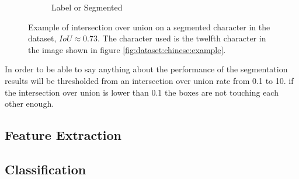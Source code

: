 \begin{figure}[ht]
\begin{subfigure}{0.24\textwidth}
    \caption{Label or Segmented}
    \label{fig:experiment:or}
  \end{subfigure}
  \caption{Example of intersection over union on a segmented character in the dataset, $IoU \approx 0.73$. The character used is the twelfth character in the image shown in figure \ref{fig:dataset:chinese:example}. }
  \label{fig:experiment:iou:example}
\end{figure}

In order to be able to say anything about the performance of the segmentation results will be thresholded from an intersection over union rate from 0.1 to 10. if the intersection over union is lower than 0.1 the boxes are not touching each other enough.


\subsection{Feature Extraction}


\subsection{Classification}




